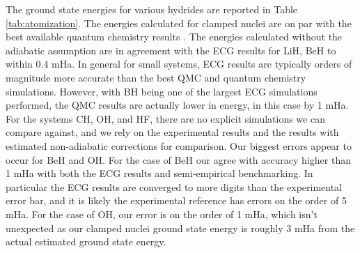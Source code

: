 The ground state energies for various hydrides are reported in Table \ref{tab:atomization}. The energies calculated for clamped nuclei are on par with the best available quantum chemistry results \cite{Adamowicz_LiH,Koput_BeH,Miliordos_BH}. The energies calculated without the adiabatic assumption are in agreement with the ECG results for LiH, BeH to within 0.4 mHa.   In general for small systems, ECG results are typically orders of magnitude more accurate than the best QMC and quantum chemistry simulations.  However, with BH being one of the largest ECG simulations performed, the QMC results are actually lower in energy, in this case by 1 mHa.  For the systems CH, OH, and HF, there are no explicit simulations we can compare against, and we rely on the experimental results and the results with estimated non-adiabatic corrections for comparison.  Our biggest errors appear to occur for BeH and OH.   For the case of BeH our agree with accuracy higher than 1 mHa with both the ECG results and semi-empirical benchmarking.  In particular the ECG results are converged to more digits than the experimental error bar, and it is likely the experimental reference has errors on the order of 5 mHa.   For the case of OH, our error is on the order of 1 mHa, which isn't unexpected as our clamped nuclei ground state energy is roughly 3 mHa from the actual estimated ground state energy.